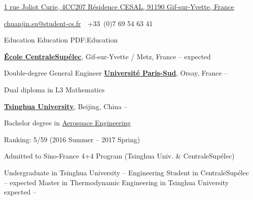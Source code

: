 \documentclass[a4paper,MMMyyyy,nonstopmode]{simpleresumecv}
\newcommand{\CVAuthor}{Chuanjin SU}
\begin{document}

\Title{\CVAuthor}

\begin{SubTitle}
\href{https://www.google.com/maps/place/1+Rue+Joliot+Curie,+91190+Gif-sur-Yvette/@48.710118,2.1622836,17z/data=!3m1!4b1!4m5!3m4!1s0x47e67f453e6e1045:0xd3bacd72705f3428!8m2!3d48.710118!4d2.1644723}
{1 rue Joliot Curie, 4CC207 Résidence CESAL, 91190 Gif-sur-Yvette, France}
\par
\href{mailto:chuanjin.su@student-cs.fr}
{chuanjin.su@student-cs.fr}
\,\SubBulletSymbol\,
+33\ (0)7 69 54 63 41
\end{SubTitle}

\begin{Body}


\Section
{Education}
{Education}
{PDF:Education}

\Entry
\href{http://www.centralesupelec.fr/}
{\textbf{École CentraleSupélec}}, Gif-sur-Yvette / Metz, France
\hfill
{} -- expected

\Gap
\BulletItem
Double-degree General Engineer
\BigGap
\Entry
\href{http://www.u-psud.fr/}
{\textbf{Université Paris-Sud}},
Orsay, France
\hfill
{} -- 

\Gap
\BulletItem
Dual diploma in L3 Mathematics

\BigGap
\Entry
\href{http://www.tsinghua.edu.cn/publish/thu2018en/index.html}
{\textbf{Tsinghua University}},
Beijing, China
\hfill
{} -- 

\Gap
\BulletItem
Bachelor degree in 
\href{http://www.hy.tsinghua.edu.cn/publish/hyen/index.html}
{Aerospace Engineering}
\begin{Detail}
    \SubBulletItem
    Ranking: 5/59 (2016 Summer -- 2017 Spring)
\end{Detail}

\Gap
\BulletItem
Admitted to Sino-France 4+4 Program (Tsinghua Univ. \& CentraleSupélec)
\begin{Detail}
    \SubBulletItem
    Undergraduate in Tsinghua University 
     -- 
    \SubBulletItem
    Engineering Student in CentraleSupélec 
     -- expected
    \SubBulletItem
    Master in Thermodynamic Engineering in Tsinghua University
    expected  -- 
\end{Detail}



\end{Body}
\end{document}
